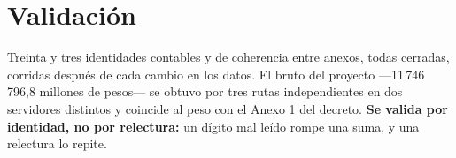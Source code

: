 \section*{Validación}

Treinta y tres identidades contables y de coherencia entre anexos, todas cerradas, corridas
después de cada cambio en los datos. El bruto del proyecto ---11\,746\,796,8 millones de
pesos--- se obtuvo por tres rutas independientes en dos servidores distintos y coincide al
peso con el Anexo 1 del decreto. \textbf{Se valida por identidad, no por relectura:} un
dígito mal leído rompe una suma, y una relectura lo repite.
\clearpage
